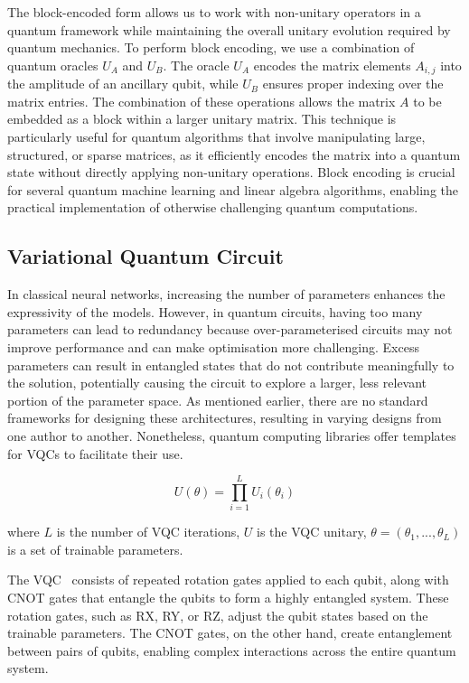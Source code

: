 \begin{itemize}
    The block-encoded form allows us to work with non-unitary
    operators in a quantum framework while maintaining the overall
    unitary evolution required by quantum mechanics.
    To perform block encoding, we use a combination of quantum
    oracles \( U_A \) and \( U_B \). The oracle \( U_A \) encodes the
    matrix elements \( A_{i,j} \) into the amplitude of an ancillary
    qubit, while \( U_B \) ensures proper indexing over the matrix
    entries. The combination of these operations allows the matrix \(
    A \) to be embedded as a block within a larger unitary matrix.
    This technique is particularly useful for quantum algorithms that
    involve manipulating large, structured, or sparse matrices, as it
    efficiently encodes the matrix into a quantum state without
    directly applying non-unitary operations. Block encoding is
    crucial for several quantum machine learning and linear algebra
    algorithms, enabling the practical implementation of otherwise
    challenging quantum computations.
\end{itemize}

\subsection{Variational Quantum Circuit}
\label{subsec:variational_quantum_circuit}
In classical neural networks, increasing the number of parameters
enhances the expressivity of the models. However, in quantum
circuits, having too many parameters can lead to redundancy because
over-parameterised circuits may not improve performance and can make
optimisation more challenging. Excess parameters can result in
entangled states that do not contribute meaningfully to the solution,
potentially causing the circuit to explore a larger, less relevant
portion of the parameter space. As mentioned earlier, there are no
standard frameworks for designing these architectures, resulting in
varying designs from one author to another. Nonetheless, quantum
computing libraries offer templates for \glspl{VQC} to facilitate their use.

\begin{equation}
  U(\theta) = \prod_{i=1}^{L} U_{i}(\theta_i)
\end{equation}

where \(L\) is the number of \gls{VQC}
iterations, \(U\) is the \gls{VQC} unitary,
\(\theta=(\theta_1,...,\theta_L )\) is a set of trainable parameters.

The \acrlong{VQC}~\cite{li2023quantum} consists of
repeated rotation gates applied to each qubit, along with CNOT gates
that entangle the qubits to form a highly entangled system. These
rotation gates, such as RX, RY, or RZ, adjust the qubit states based
on the trainable parameters. The CNOT gates, on the other hand,
create entanglement between pairs of qubits, enabling complex
interactions across the entire quantum system.

